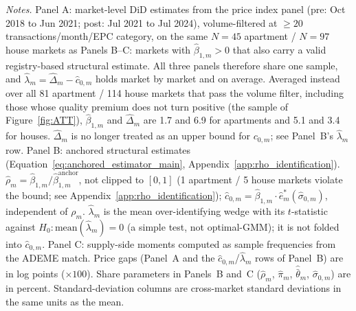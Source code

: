 \begin{table}[t]
\begin{minipage}{\linewidth}
\footnotesize\textit{Notes.} Panel A: market-level DiD estimates from the price index panel (pre: Oct 2018 to Jun 2021; post: Jul 2021 to Jul 2024), volume-filtered at $\geq 20$ transactions/month/EPC category, on the same $N=45$ apartment / $N=97$ house markets as Panels B--C: markets with $\hat\beta_{1,m}>0$ that also carry a valid registry-based structural estimate. All three panels therefore share one sample, and $\hat\lambda_m=\hat\Delta_m-\hat c_{0,m}$ holds market by market and on average. Averaged instead over all 81 apartment / 114 house markets that pass the volume filter, including those whose quality premium does not turn positive (the sample of Figure~\ref{fig:ATT}), $\hat\beta_{1,m}$ and $\hat\Delta_m$ are 1.7 and 6.9 for apartments and 5.1 and 3.4 for houses. $\hat\Delta_m$ is no longer treated as an upper bound for $c_{0,m}$; see Panel~B's $\hat\lambda_m$ row. Panel B: anchored structural estimates (Equation~\eqref{eq:anchored_estimator_main}, Appendix~\ref{app:rho_identification}). $\hat\rho_m=\hat\beta_{1,m}/\hat\beta_{1,m}^{\mathrm{anchor}}$, not clipped to $[0,1]$ (1 apartment / 5 house markets violate the bound; see Appendix~\ref{app:rho_identification}); $\hat c_{0,m}=\hat\beta_{1,m}\cdot\hat e^*_m(\hat\sigma_{0,m})$, independent of $\rho_m$. $\hat\lambda_m$ is the mean over-identifying wedge with its $t$-statistic against $H_0:\text{mean}(\hat\lambda_m)=0$ (a simple test, not optimal-GMM); it is not folded into $\hat c_{0,m}$. Panel C: supply-side moments computed as sample frequencies from the ADEME match. Price gaps (Panel~A and the $\hat c_{0,m}$/$\hat\lambda_m$ rows of Panel~B) are in log points ($\times 100$). Share parameters in Panels~B and~C ($\hat\rho_m$, $\hat\pi_m$, $\hat{\bar\theta}_m$, $\hat\sigma_{0,m}$) are in percent. Standard-deviation columns are cross-market standard deviations in the same units as the mean.
\end{minipage}
\end{table}

\vspace{-1em}

